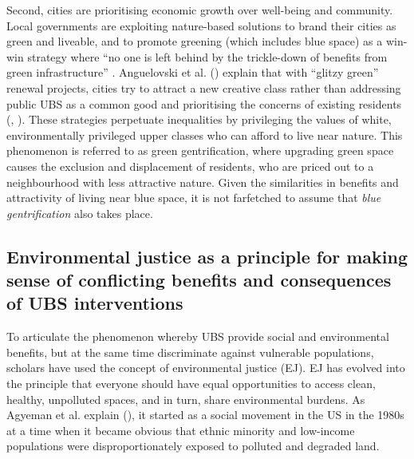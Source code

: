 \documentclass{article}
\newcommand{\alignedmarginpar}[1]{%
        \marginpar{\raggedright\small #1}
    }
\begin{document}
Second, cities are prioritising economic growth over well-being and community. Local governments are exploiting nature-based solutions to brand their cities as green and liveable,
and to promote greening (which includes blue space) as a win-win strategy where ``no one is left behind by the trickle-down of benefits from green infrastructure'' \parencite{anguelovski2021green}.
Anguelovski et al. (\citeyear{anguelovski2021green}) explain that with ``glitzy green'' renewal projects, cities try to attract a new creative class rather than addressing public UBS as a common good and prioritising the concerns of existing residents (\cite{wessells2014urban}, \cite{anguelovski2020expanding}).
These strategies perpetuate inequalities by privileging the values of white, environmentally privileged upper classes who can afford to live near nature. This phenomenon is referred to as green gentrification, where upgrading green space causes the exclusion and displacement of residents, who are priced out to a neighbourhood with less attractive nature. Given the similarities in benefits and attractivity of living near blue space, it is not farfetched to assume that \textit{blue gentrification} also takes place.

\subsection{Environmental justice as a principle for making sense of conflicting benefits and consequences of UBS interventions}  %
\alignedmarginpar{But is EJ still useful here?}

To articulate the phenomenon whereby UBS provide social and environmental benefits, but at the same time discriminate against vulnerable populations, scholars have used the concept of environmental justice (EJ).
EJ has evolved into the principle that everyone should have equal opportunities to access clean, healthy, unpolluted spaces, and in turn, share environmental burdens. As Agyeman et al. explain (\citeyear{agyeman2016trends}), it started as a social movement in the US in the 1980s at a time when it became obvious that ethnic minority and low-income populations were disproportionately exposed to polluted and degraded land.
\end{document}

